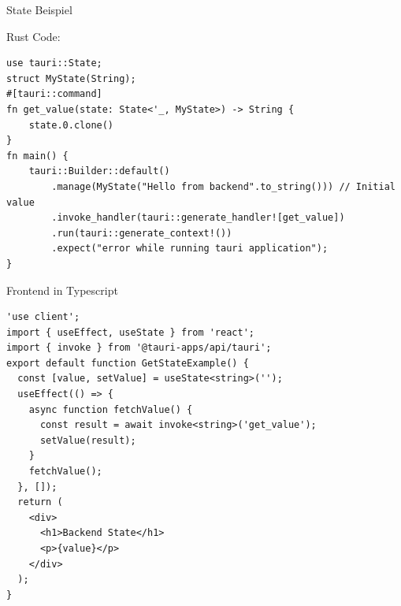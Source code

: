 \LARGE
State Beispiel
\label{subsec:state-example}
\large

Rust Code:
{\small
\begin{verbatim}
use tauri::State;
struct MyState(String);
#[tauri::command]
fn get_value(state: State<'_, MyState>) -> String {
    state.0.clone()
}
fn main() {
    tauri::Builder::default()
        .manage(MyState("Hello from backend".to_string())) // Initial value
        .invoke_handler(tauri::generate_handler![get_value])
        .run(tauri::generate_context!())
        .expect("error while running tauri application");
}
\end{verbatim}
}


Frontend in Typescript
{\small

\begin{verbatim}
'use client';
import { useEffect, useState } from 'react';
import { invoke } from '@tauri-apps/api/tauri';
export default function GetStateExample() {
  const [value, setValue] = useState<string>('');
  useEffect(() => {
    async function fetchValue() {
      const result = await invoke<string>('get_value');
      setValue(result);
    }
    fetchValue();
  }, []);
  return (
    <div>
      <h1>Backend State</h1>
      <p>{value}</p>
    </div>
  );
}
\end{verbatim}
}


